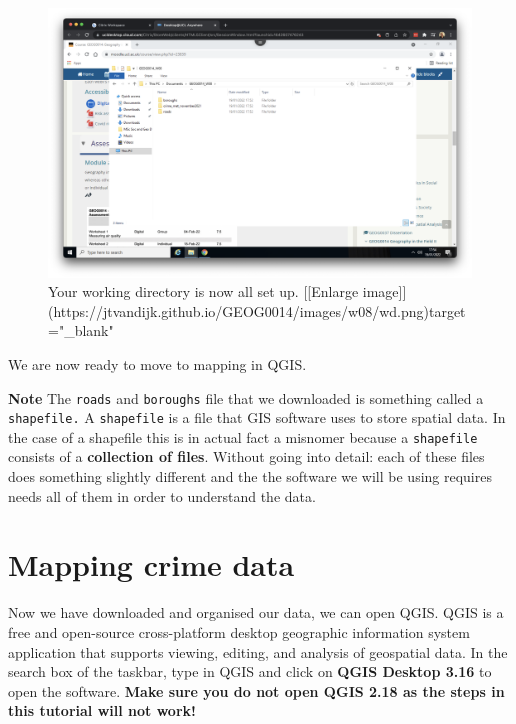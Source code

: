 \documentclass[
]{book}
\begin{document}
\begin{figure}

{\centering \includegraphics[width=850pt]{images/w08/wd} 

}

\caption{Your working directory is now all set up. [[Enlarge image]](https://jtvandijk.github.io/GEOG0014/images/w08/wd.png){target="_blank"}}\label{fig:wd}
\end{figure}

We are now ready to move to mapping in QGIS.

\textbf{Note}
The \texttt{roads} and \texttt{boroughs} file that we downloaded is something called a \texttt{shapefile.} A \texttt{shapefile} is a file that GIS software uses to store spatial data. In the case of a shapefile this is in actual fact a misnomer because a \texttt{shapefile} consists of a \textbf{collection of files}. Without going into detail: each of these files does something slightly different and the the software we will be using requires needs all of them in order to understand the data.

\hypertarget{mapping-crime-data}{%
\section*{Mapping crime data}\label{mapping-crime-data}}

Now we have downloaded and organised our data, we can open QGIS. QGIS is a free and open-source cross-platform desktop geographic information system application that supports viewing, editing, and analysis of geospatial data. In the search box of the taskbar, type in QGIS and click on \textbf{QGIS Desktop 3.16} to open the software. \textbf{Make sure you do not open QGIS 2.18 as the steps in this tutorial will not work!}
\end{document}
